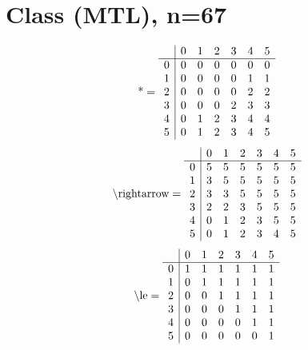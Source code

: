 \documentclass[11pt]{article}
\begin{document}
\section{Class (MTL), n=67}
\[\text{*} = 
\begin{array}{r | r r r r r r}
 & 0 & 1 & 2 & 3 & 4 & 5 \\ \hline
0 & 0 & 0 & 0 & 0 & 0 & 0 \\
1 & 0 & 0 & 0 & 0 & 1 & 1 \\
2 & 0 & 0 & 0 & 0 & 2 & 2 \\
3 & 0 & 0 & 0 & 2 & 3 & 3 \\
4 & 0 & 1 & 2 & 3 & 4 & 4 \\
5 & 0 & 1 & 2 & 3 & 4 & 5 \\
\end{array}
\]
\[\text{\textbackslash rightarrow} = 
\begin{array}{r | r r r r r r}
 & 0 & 1 & 2 & 3 & 4 & 5 \\ \hline
0 & 5 & 5 & 5 & 5 & 5 & 5 \\
1 & 3 & 5 & 5 & 5 & 5 & 5 \\
2 & 3 & 3 & 5 & 5 & 5 & 5 \\
3 & 2 & 2 & 3 & 5 & 5 & 5 \\
4 & 0 & 1 & 2 & 3 & 5 & 5 \\
5 & 0 & 1 & 2 & 3 & 4 & 5 \\
\end{array}
\]
\[\text{\textbackslash le} = 
\begin{array}{r | r r r r r r}
 & 0 & 1 & 2 & 3 & 4 & 5 \\ \hline
0 & 1 & 1 & 1 & 1 & 1 & 1 \\
1 & 0 & 1 & 1 & 1 & 1 & 1 \\
2 & 0 & 0 & 1 & 1 & 1 & 1 \\
3 & 0 & 0 & 0 & 1 & 1 & 1 \\
4 & 0 & 0 & 0 & 0 & 1 & 1 \\
5 & 0 & 0 & 0 & 0 & 0 & 1 \\
\end{array}
\]
\end{document}
